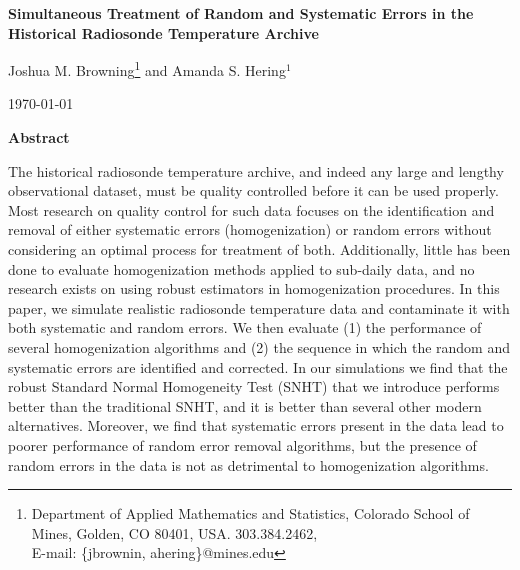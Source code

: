 \documentclass[12pt]{article}
\def\ni{\noindent}
\begin{document}
\thispagestyle{empty}
\baselineskip=28pt
\vskip 5mm
\begin{center} {\Large{\bf   Simultaneous Treatment of Random and Systematic Errors in the Historical Radiosonde Temperature Archive}}
\end{center}



\baselineskip=12pt
\vskip 5mm

\begin{center}\large
Joshua M. Browning\footnote{ \baselineskip=10pt
Department of Applied Mathematics and Statistics, Colorado School of Mines, Golden, CO 80401,
USA. 303.384.2462, \\E-mail: \{jbrownin, ahering\}@mines.edu} and Amanda S. Hering$^1$




\end{center}

\baselineskip=17pt
\vskip 5mm
\centerline{\today}
\vskip 5mm

\begin{center}
{\large{\bf Abstract}}
\end{center}

\baselineskip=14pt

\ni  The historical radiosonde temperature archive, and indeed any large and lengthy observational dataset, must be quality controlled before it can be used properly.   Most research on quality control for such data focuses on the identification and removal of either systematic errors (homogenization) or random errors without considering an optimal process for treatment of both.  Additionally, little has been done to evaluate  homogenization methods applied to sub-daily data, and no research exists on using robust estimators in homogenization procedures.  In this paper, we simulate realistic radiosonde temperature data and contaminate it with both systematic and random errors.  We then evaluate (1) the performance of several homogenization algorithms and (2) the sequence in which the random and systematic errors are identified and corrected.  In our simulations we find that the robust Standard Normal Homogeneity Test (SNHT) that we introduce performs better than the traditional SNHT, and it is better than several other modern alternatives.  Moreover, we find that systematic errors present in the data lead to poorer performance of random error removal algorithms, but the presence of random errors in the data is not as detrimental to homogenization algorithms.
\end{document}
